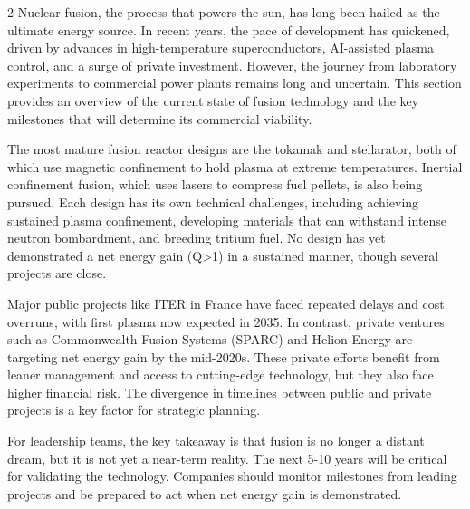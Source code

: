 \documentclass[10pt,a4paper]{article}
\begin{document}
\begin{multicols}{2}
{\small Nuclear fusion, the process that powers the sun, has long been hailed as the ultimate energy source. In recent years, the pace of development has quickened, driven by advances in high-temperature superconductors, AI-assisted plasma control, and a surge of private investment. However, the journey from laboratory experiments to commercial power plants remains long and uncertain. This section provides an overview of the current state of fusion technology and the key milestones that will determine its commercial viability.}\par
{\small The most mature fusion reactor designs are the tokamak and stellarator, both of which use magnetic confinement to hold plasma at extreme temperatures. Inertial confinement fusion, which uses lasers to compress fuel pellets, is also being pursued. Each design has its own technical challenges, including achieving sustained plasma confinement, developing materials that can withstand intense neutron bombardment, and breeding tritium fuel. No design has yet demonstrated a net energy gain (Q>1) in a sustained manner, though several projects are close.}\par
{\small Major public projects like ITER in France have faced repeated delays and cost overruns, with first plasma now expected in 2035. In contrast, private ventures such as Commonwealth Fusion Systems (SPARC) and Helion Energy are targeting net energy gain by the mid-2020s. These private efforts benefit from leaner management and access to cutting-edge technology, but they also face higher financial risk. The divergence in timelines between public and private projects is a key factor for strategic planning.}\par
{\small For leadership teams, the key takeaway is that fusion is no longer a distant dream, but it is not yet a near-term reality. The next 5-10 years will be critical for validating the technology. Companies should monitor milestones from leading projects and be prepared to act when net energy gain is demonstrated.}\par
\end{multicols}
\label{chap:1:end}
\end{document}
